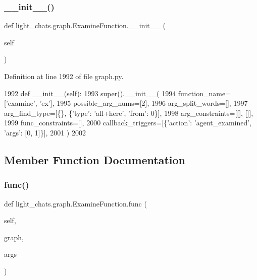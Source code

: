 \subsubsection{\texorpdfstring{\+\_\+\+\_\+init\+\_\+\+\_\+()}{\_\_init\_\_()}}
{\footnotesize\ttfamily def light\+\_\+chats.\+graph.\+Examine\+Function.\+\_\+\+\_\+init\+\_\+\+\_\+ (\begin{DoxyParamCaption}\item[{}]{self }\end{DoxyParamCaption})}



Definition at line 1992 of file graph.\+py.


\begin{DoxyCode}
1992     \textcolor{keyword}{def }\_\_init\_\_(self):
1993         super().\_\_init\_\_(
1994             function\_name=[\textcolor{stringliteral}{'examine'}, \textcolor{stringliteral}{'ex'}],
1995             possible\_arg\_nums=[2],
1996             arg\_split\_words=[],
1997             arg\_find\_type=[\{\}, \{\textcolor{stringliteral}{'type'}: \textcolor{stringliteral}{'all+here'}, \textcolor{stringliteral}{'from'}: 0\}],
1998             arg\_constraints=[[], []],
1999             func\_constraints=[],
2000             callback\_triggers=[\{\textcolor{stringliteral}{'action'}: \textcolor{stringliteral}{'agent\_examined'}, \textcolor{stringliteral}{'args'}: [0, 1]\}],
2001         )
2002 
\end{DoxyCode}


\subsection{Member Function Documentation}
\mbox{\label{classlight__chats_1_1graph_1_1ExamineFunction_a5a9150659aa698ebf73e302056c5ba46}} 
\subsubsection{\texorpdfstring{func()}{func()}}
{\footnotesize\ttfamily def light\+\_\+chats.\+graph.\+Examine\+Function.\+func (\begin{DoxyParamCaption}\item[{}]{self,  }\item[{}]{graph,  }\item[{}]{args }\end{DoxyParamCaption})}

